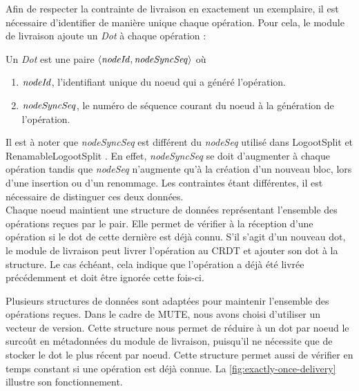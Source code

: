 \label{sec:mute-exactly-once-delivery}

Afin de respecter la contrainte de livraison en exactement un exemplaire, il est nécessaire d'identifier de manière unique chaque opération.
Pour cela, le module de livraison ajoute un \emph{Dot} \cite{2014-scalable-accurate-causality-tracking} à chaque opération :

\begin{definition}[Dot]
  \label{def:dot}
  Un \emph{Dot} est une paire $\langle \mathit{nodeId}, \mathit{nodeSyncSeq}\rangle$ où
  \begin{enumerate}
    \item $\mathit{nodeId}$, l'identifiant unique du noeud qui a généré l'opération.
    \item $\mathit{nodeSyncSeq}$, le numéro de séquence courant du noeud à la génération de l'opération.
  \end{enumerate}
\end{definition}

Il est à noter que \emph{nodeSyncSeq} est différent du \emph{nodeSeq} utilisé dans LogootSplit et RenamableLogootSplit .
En effet, \emph{nodeSyncSeq} se doit d'augmenter à chaque opération tandis que \emph{nodeSeq} n'augmente qu'à la création d'un nouveau bloc, \ie lors d'une insertion ou d'un renommage.
Les contraintes étant différentes, il est nécessaire de distinguer ces deux données.\\

Chaque noeud maintient une structure de données représentant l'ensemble des opérations reçues par le pair.
Elle permet de vérifier à la réception d'une opération si le dot de cette dernière est déjà connu.
S'il s'agit d'un nouveau dot, le module de livraison peut livrer l'opération au \ac{CRDT} et ajouter son dot à la structure.
Le cas échéant, cela indique que l'opération a déjà été livrée précédemment et doit être ignorée cette fois-ci.

Plusieurs structures de données sont adaptées pour maintenir l'ensemble des opérations reçues.
Dans le cadre de MUTE, nous avons choisi d'utiliser un vecteur de version.
Cette structure nous permet de réduire à un dot par noeud le surcoût en métadonnées du module de livraison, puisqu'il ne nécessite que de stocker le dot le plus récent par noeud.
Cette structure permet aussi de vérifier en temps constant si une opération est déjà connue.
La \autoref{fig:exactly-once-delivery} illustre son fonctionnement.\\

